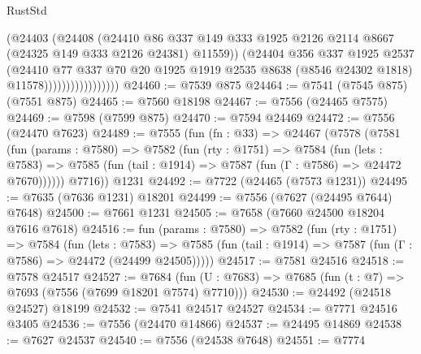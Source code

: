 \begin{lexlean}{RustStd}
\begin{coremodule}
                                (@24403
                                  (@24408
                                    (@24410
                                      @86
                                      @337
                                      @149
                                      @333
                                      @1925
                                      @2126
                                      @2114
                                      @8667
                                      (@24325 @149 @333 @2126 @24381)
                                      @11559))
                                  (@24404
                                    @356
                                    @337
                                    @1925
                                    @2537
                                    (@24410
                                      @77
                                      @337
                                      @70
                                      @20
                                      @1925
                                      @1919
                                      @2535
                                      @8638
                                      (@8546 @24302 @1818)
                                      @11578)))))))))))))))))
@24460 := @7539 @875
@24464 := @7541 (@7545 @875) (@7551 @875)
@24465 := @7560 @18198
@24467 := @7556 (@24465 @7575)
@24469 := @7598 (@7599 @875)
@24470 := @7594 @24469
@24472 := @7556 (@24470 @7623)
@24489 := @7555
    (fun (fn : @33) =>
    @24467
      (@7578
        (@7581
          (fun (params : @7580) =>
          @7582
            (fun (rty : @1751) =>
            @7584
              (fun (lets : @7583) =>
              @7585 (fun (tail : @1914) => @7587 (fun (Γ : @7586) => @24472 @7670))))))
        @7716))
    @1231
@24492 := @7722 (@24465 (@7573 @1231))
@24495 := @7635 (@7636 @1231) @18201
@24499 := @7556 (@7627 (@24495 @7644) @7648)
@24500 := @7661 @1231
@24505 := @7658 (@7660 @24500 @18204 @7616 @7618)
@24516 := fun (params : @7580) =>
  @7582
    (fun (rty : @1751) =>
    @7584
      (fun (lets : @7583) =>
      @7585 (fun (tail : @1914) => @7587 (fun (Γ : @7586) => @24472 (@24499 @24505)))))
@24517 := @7581 @24516
@24518 := @7578 @24517
@24527 := @7684
    (fun (U : @7683) => @7685 (fun (t : @7) => @7693 (@7556 (@7699 @18201 @7574) @7710)))
@24530 := @24492 (@24518 @24527) @18199
@24532 := @7541 @24517 @24527
@24534 := @7771 @24516 @3405
@24536 := @7556 (@24470 @14866)
@24537 := @24495 @14869
@24538 := @7627 @24537
@24540 := @7556 (@24538 @7648)
@24551 := @7774

\end{coremodule}
\end{lexlean}
